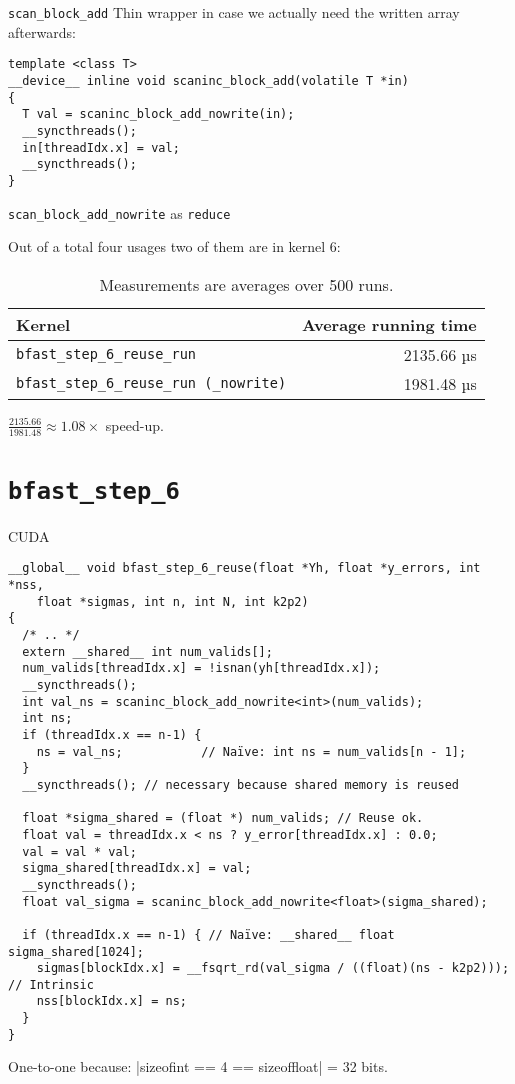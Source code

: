 \begin{frame}[fragile]{\texttt{scan\_block\_add}}
    Thin wrapper in case we actually need the written array afterwards:
\begin{verbatim}
template <class T>
__device__ inline void scaninc_block_add(volatile T *in)
{
  T val = scaninc_block_add_nowrite(in);
  __syncthreads();
  in[threadIdx.x] = val;
  __syncthreads();
}
\end{verbatim}
\end{frame}

\begin{frame}[fragile]{\texttt{scan\_block\_add\_nowrite} as \texttt{reduce}}

    Out of a total four usages two of them are in kernel 6:

    \begin{table}
        \centering
        \begin{tabular}{l r}
            \textbf{Kernel} & \textbf{Average running time} \\ \hline
            \texttt{bfast\_step\_6\_reuse\_run} &     2135.66 µs \\
            \texttt{bfast\_step\_6\_reuse\_run (\_nowrite)} & 1981.48 µs
        \end{tabular}
        \caption{Measurements are averages over 500 runs.}
        \label{tab:nowrite}
    \end{table}

\(\frac{2135.66}{1981.48}  \approx 1.08 \times \) speed-up.

\end{frame}

\section{\texttt{bfast\_step\_6}} 

\begin{frame}[fragile]{CUDA}

\begin{verbatim}
__global__ void bfast_step_6_reuse(float *Yh, float *y_errors, int *nss,
    float *sigmas, int n, int N, int k2p2)
{
  /* .. */
  extern __shared__ int num_valids[];
  num_valids[threadIdx.x] = !isnan(yh[threadIdx.x]);
  __syncthreads();
  int val_ns = scaninc_block_add_nowrite<int>(num_valids);
  int ns;
  if (threadIdx.x == n-1) {
    ns = val_ns;           // Naïve: int ns = num_valids[n - 1];
  }
  __syncthreads(); // necessary because shared memory is reused

  float *sigma_shared = (float *) num_valids; // Reuse ok.
  float val = threadIdx.x < ns ? y_error[threadIdx.x] : 0.0;
  val = val * val;
  sigma_shared[threadIdx.x] = val;
  __syncthreads();
  float val_sigma = scaninc_block_add_nowrite<float>(sigma_shared);

  if (threadIdx.x == n-1) { // Naïve: __shared__ float sigma_shared[1024];
    sigmas[blockIdx.x] = __fsqrt_rd(val_sigma / ((float)(ns - k2p2))); // Intrinsic
    nss[blockIdx.x] = ns;
  }
}
\end{verbatim}
\pause
One-to-one because: |sizeof{int} == 4 == sizeof{float}| = 32 bits.

\end{frame}

